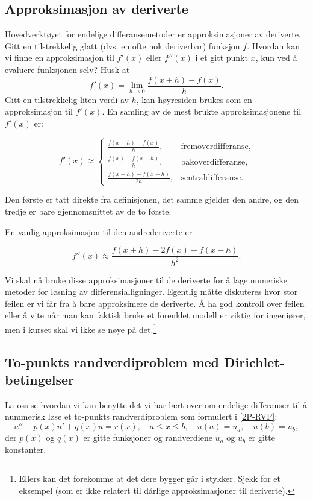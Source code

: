 \subsection{Approksimasjon av deriverte}
Hovedverktøyet for endelige differansemetoder er approksimasjoner av deriverte.
Gitt en tilstrekkelig glatt (dvs. en ofte nok deriverbar) funksjon \( f \). Hvordan kan vi finne en approksimasjon til \( f'(x) \) eller \( f''(x) \) i et gitt punkt \( x \), kun ved å evaluere funksjonen selv? Husk at
\[
f'(x) = \lim_{h \to 0} \frac{f(x + h) - f(x)}{h}.
\]
Gitt en tilstrekkelig liten verdi av \( h \), kan høyresiden brukes som en approksimasjon til \( f'(x) \).
En samling av de mest brukte approksimasjonene til \( f'(x) \) er:
\begin{tcolorbox}[colback=white,colframe=blue!75!black,title= Differanseformler for første deriverte]
    \[
f'(x) \approx
\begin{cases}
\displaystyle \frac{f(x + h) - f(x)}{h}, & \text{fremoverdifferanse}, \\
\displaystyle \frac{f(x) - f(x - h)}{h}, & \text{bakoverdifferanse}, \\
\displaystyle \frac{f(x + h) - f(x - h)}{2h}, & \text{sentraldifferanse}.
\end{cases}
\]
\end{tcolorbox}
Den første er tatt direkte fra definisjonen, det samme gjelder den andre, og den tredje er bare gjennomsnittet av de to første.

En vanlig approksimasjon til den andrederiverte er
\begin{tcolorbox}[colback=white,colframe=blue!75!black,title= Differanseformel for andre deriverte]
\[
f''(x) \approx \frac{f(x + h) - 2f(x) + f(x - h)}{h^2}.
\]
\end{tcolorbox}
Vi skal nå bruke disse approksimasjoner til de deriverte for å lage numeriske metoder for løsning av differensialligninger. Egentlig måtte diskuteres hvor stor feilen er vi får fra å bare approksimere de deriverte. Å ha god kontroll over feilen eller å vite når man kan faktisk bruke et forenklet modell er viktig for ingeniører, men i kurset skal vi ikke se nøye på det.\footnote{Ellers kan det forekomme at det dere bygger går i stykker. Sjekk \cite{TNB15} for et eksempel (som er ikke relatert til dårlige approksimasjoner til deriverte).}

\subsection{To-punkts randverdiproblem med Dirichlet-betingelser}
La oss se hvordan vi kan benytte det vi har lært over om endelige differanser til å nummerisk løse et to-punkts randverdiproblem som formulert i \eqref{2P-RVP}:
\[
u'' + p(x)u' + q(x)u = r(x), \quad a \leq x \leq b, \quad u(a) = u_a, \quad u(b) = u_b,
\]
der \( p(x) \) og \( q(x) \) er gitte funksjoner og randverdiene \( u_a \) og \( u_b \) er gitte konstanter.

